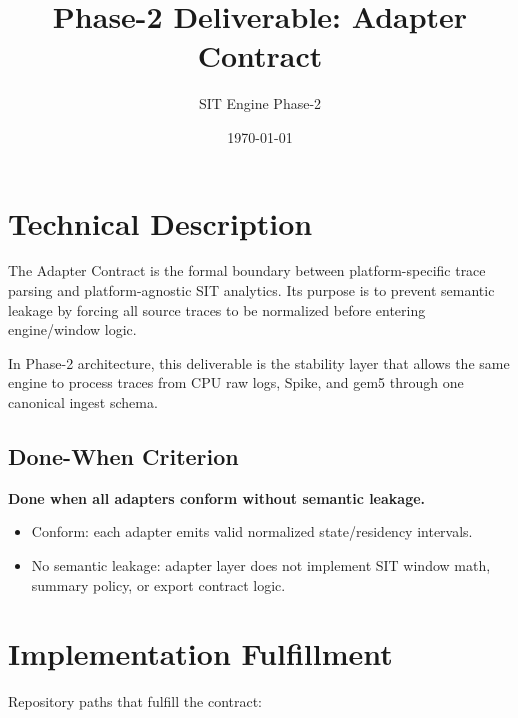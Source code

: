 \documentclass[11pt]{article}
\title{Phase-2 Deliverable: Adapter Contract}
\author{SIT Engine Phase-2}
\date{\today}
\begin{document}
\maketitle

\setlength{\tabcolsep}{4pt}
\renewcommand{\arraystretch}{1.15}
\newcommand{\codepath}[1]{\path{#1}}

\section{Technical Description}
The Adapter Contract is the formal boundary between platform-specific trace parsing and platform-agnostic SIT analytics. Its purpose is to prevent semantic leakage by forcing all source traces to be normalized before entering engine/window logic.

In Phase-2 architecture, this deliverable is the stability layer that allows the same engine to process traces from CPU raw logs, Spike, and gem5 through one canonical ingest schema.

\subsection*{Done-When Criterion}
\textbf{Done when all adapters conform without semantic leakage.}
\begin{itemize}[leftmargin=*]
  \item Conform: each adapter emits valid normalized state/residency intervals.
  \item No semantic leakage: adapter layer does not implement SIT window math, summary policy, or export contract logic.
\end{itemize}

\section{Implementation Fulfillment}
Repository paths that fulfill the contract:
\end{document}
